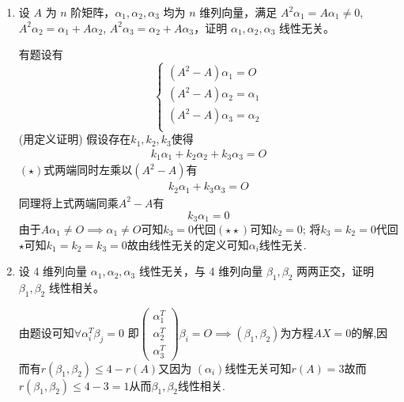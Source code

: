 \documentclass[12pt, a4paper, oneside, UTF8]{ctexbook}
\begin{document}
\begin{enumerate}
    \item 设 $A$ 为 $n$ 阶矩阵，$\alpha_1, \alpha_2, \alpha_3$ 均为 $n$ 维列向量，满足 $A^2\alpha_1 = A\alpha_1 \neq 0$, $A^2\alpha_2 = \alpha_1 + A\alpha_2$,
    $A^2\alpha_3 = \alpha_2 + A\alpha_3$，证明 $\alpha_1, \alpha_2, \alpha_3$ 线性无关。
    
    \begin{solution}
    有题设有
    $$
    \begin{cases}
        (A^2-A)\alpha_1 = O \\
        (A^2-A)\alpha_2 = \alpha_1 \\
        (A^2-A)\alpha_3 = \alpha_2 \\
    \end{cases}
    $$
    (用定义证明) 假设存在$k_1,k_2,k_3$使得
    \begin{align*}
        k_1\alpha_1+k_2\alpha_2+k_3\alpha_3=O \tag{$\star$}
    \end{align*}
    $(\star)$式两端同时左乘以$(A^2-A)$有
    \begin{align*}
        k_2\alpha_1+k_3\alpha_3=O \tag{$\star\star$}
    \end{align*}
    同理将上式两端同乘$A^2-A$有
    $$
    k_3\alpha_1 = 0 
    $$
    由于$A\alpha_1\neq O \implies \alpha_1\neq O$可知$k_3=0$代回$(\star\star)$可知$k_2=0$;
    将$k_3=k_2=0$代回$\star$可知$k_1=k_2=k_3=0$故由线性无关的定义可知$\alpha_i$线性无关. 
    \end{solution}
    
    \item 设 4 维列向量 $\alpha_1, \alpha_2, \alpha_3$ 线性无关，与 4 维列向量 $\beta_1, \beta_2$ 两两正交，证明 $\beta_1, \beta_2$ 线性相关。
    
    \begin{solution}
    由题设可知$\forall \alpha_i^T\beta_j=0$ 即$\begin{pmatrix}
        \alpha_1^T \\
        \alpha_2^T \\
        \alpha_3^T
    \end{pmatrix}\beta_i=O\implies (\beta_1,\beta_2)$为方程$AX=0$的解,因而有$r(\beta_1,\beta_2)\leq 4-r(A)$又因为
    $(\alpha_i)$线性无关可知$r(A)=3$故而$r(\beta_1,\beta_2)\leq 4-3=1$从而$\beta_1,\beta_2$线性相关. 
    \end{solution}
\end{enumerate}
\newpage
\end{document}
